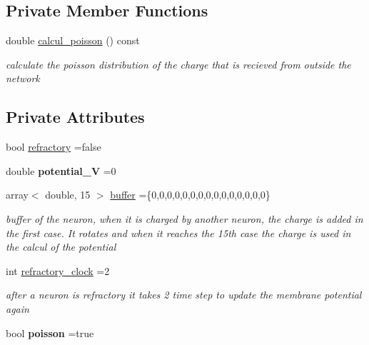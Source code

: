 \subsection*{Private Member Functions}
\begin{DoxyCompactItemize}
\item 
\mbox{\label{class_neuron_aa041a07cbcde2d11672e2719f9142f88}} 
double \hyperlink{class_neuron_aa041a07cbcde2d11672e2719f9142f88}{calcul\+\_\+poisson} () const
\begin{DoxyCompactList}\small\item\em calculate the poisson distribution of the charge that is recieved from outside the network \end{DoxyCompactList}\end{DoxyCompactItemize}
\subsection*{Private Attributes}
\begin{DoxyCompactItemize}
\item 
bool \hyperlink{class_neuron_aa8becbf43a8a371a89d00ebf9c79ff88}{refractory} =false
\item 
\mbox{\label{class_neuron_adf7e2553c726153c3231de7c33f83228}} 
double {\bfseries potential\+\_\+V} =0
\item 
\mbox{\label{class_neuron_adaa6ad5e0febdab056ed73d59ce45044}} 
array$<$ double, 15 $>$ \hyperlink{class_neuron_adaa6ad5e0febdab056ed73d59ce45044}{buffer} =\{0,0,0,0,0,0,0,0,0,0,0,0,0,0,0\}
\begin{DoxyCompactList}\small\item\em buffer of the neuron, when it is charged by another neuron, the charge is added in the first case. It rotates and when it reaches the 15th case the charge is used in the calcul of the potential \end{DoxyCompactList}\item 
\mbox{\label{class_neuron_a801063d9eebb08d0605743eab1fba11f}} 
int \hyperlink{class_neuron_a801063d9eebb08d0605743eab1fba11f}{refractory\+\_\+clock} =2
\begin{DoxyCompactList}\small\item\em after a neuron is refractory it takes 2 time step to update the membrane potential again \end{DoxyCompactList}\item 
\mbox{\label{class_neuron_adf7b81d5f363ea9580937f4efa1b12f2}} 
bool {\bfseries poisson} =true
\end{DoxyCompactItemize}


